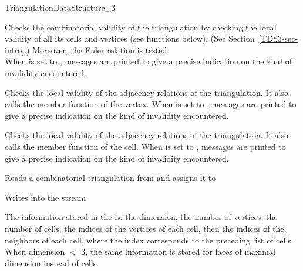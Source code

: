 \begin{ccRefConcept}{TriangulationDataStructure_3}
\begin{ccAdvanced}

{Checks the combinatorial validity of the triangulation by checking
the local validity of all its cells and vertices (see functions below). 
(See Section~\ref{TDS3-sec-intro}.) Moreover, the Euler relation is
tested.\\
When  is set to , messages are printed to give
a precise indication on the kind of invalidity encountered.}

{Checks the local validity of the adjacency relations of the triangulation.
It also calls the  member function of the vertex.
When  is set to , messages are printed to give
a precise indication on the kind of invalidity encountered.}

{Checks the local validity of the adjacency relations of the triangulation.
It also calls the  member function of the cell.
When  is set to , messages are printed to give
a precise indication on the kind of invalidity encountered.}

\end{ccAdvanced}


{Reads a combinatorial triangulation from  and assigns it to }

{Writes  into the stream }

The information stored in the  is: 
the dimension, the number of vertices, the number of cells,
the indices of the vertices of each cell, then the indices of the
neighbors of each cell, where the index corresponds to the preceding
list of cells. When dimension $<$ 3, the same information is stored
for faces of maximal dimension instead of cells.

\ccHasModels


\ccSeeAlso

\\

\end{ccRefConcept}
